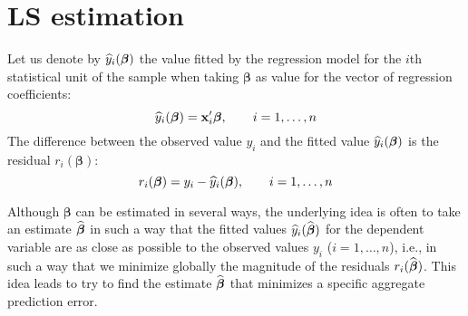 \section{LS estimation}

Let us denote by $\widehat{y}_{i}(\boldsymbol\beta)$ the value fitted by the
regression model for the $i$th statistical unit of the sample when taking
$\boldsymbol\beta$ as value for the vector of regression coefficients:
\[
    \widehat{y}_{i}(\boldsymbol\beta)  = \mathbf x_{i}'\boldsymbol\beta, 
    \qquad i = 1, \dots, n
\]
The difference between the observed value $y_{i}$ and the fitted value
$\widehat{y}_{i}(\boldsymbol\beta)$ is the residual $r_{i}(\boldsymbol\beta)$:
\[
    r_{i}(\boldsymbol\beta) = y_{i} - \widehat{y}_{i}(\boldsymbol\beta),
    \qquad i = 1, \dots, n
\]

Although $\boldsymbol\beta$ can be estimated in several ways, the underlying
idea is often to take an estimate $\widehat{\boldsymbol\beta}$ in such a way that
the fitted values $\widehat{y}_{i}(\widehat{\boldsymbol\beta})$ for the dependent
variable are as close as possible to the observed values $y_{i}$ ($i = 1,
\dots, n$), i.e., in such a way that we minimize globally the magnitude of the
residuals $r_{i}(\widehat{\boldsymbol\beta})$. This idea leads to try to find the
estimate $\widehat{\boldsymbol\beta}$ that minimizes a specific aggregate
prediction error.

